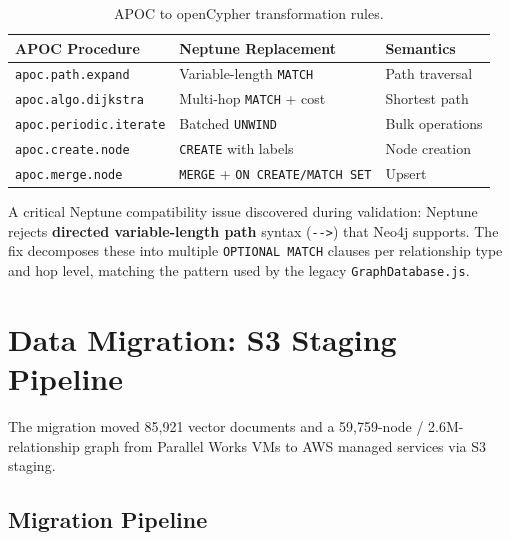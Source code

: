 \documentclass[11pt,letterpaper]{article}
\begin{document}
\begin{table}[H]
\centering
\footnotesize
\begin{tabular}{@{}lll@{}}
\toprule
\textbf{APOC Procedure} & \textbf{Neptune Replacement} & \textbf{Semantics} \\
\midrule
\texttt{apoc.path.expand} & Variable-length \texttt{MATCH} & Path traversal \\
\texttt{apoc.algo.dijkstra} & Multi-hop \texttt{MATCH} + cost & Shortest path \\
\texttt{apoc.periodic.iterate} & Batched \texttt{UNWIND} & Bulk operations \\
\texttt{apoc.create.node} & \texttt{CREATE} with labels & Node creation \\
\texttt{apoc.merge.node} & \texttt{MERGE} + \texttt{ON CREATE/MATCH SET} & Upsert \\
\bottomrule
\end{tabular}
\caption{APOC to openCypher transformation rules.}
\label{tab:apoc-transforms}
\end{table}

A critical Neptune compatibility issue discovered during validation:
Neptune rejects \textbf{directed variable-length path} syntax
(\texttt{-\relax[:REL*1..N]->}) that Neo4j supports. The fix decomposes these
into multiple \texttt{OPTIONAL MATCH} clauses per relationship type and
hop level, matching the pattern used by the legacy \texttt{GraphDatabase.js}.

\section{Data Migration: S3 Staging Pipeline}
\label{sec:migration}

The migration moved 85,921 vector documents and a 59,759-node / 2.6M-relationship
graph from Parallel Works VMs to AWS managed services via S3 staging.

\subsection{Migration Pipeline}
\end{document}
